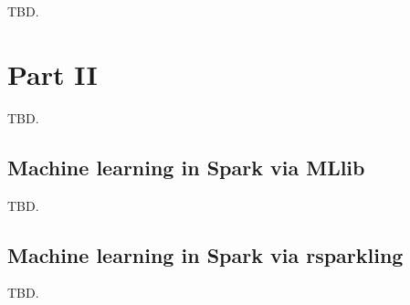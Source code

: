 \documentclass[]{book}
\theoremstyle{definition}
\theoremstyle{definition}
\theoremstyle{definition}
\theoremstyle{remark}
\begin{document}
TBD.

\hypertarget{part-part-ii}{%
\part{Part II}\label{part-part-ii}}

TBD.

\hypertarget{machine-learning-in-spark-via-mllib}{%
\chapter{Machine learning in Spark via
MLlib}\label{machine-learning-in-spark-via-mllib}}

TBD.

\hypertarget{machine-learning-in-spark-via-rsparkling}{%
\chapter{Machine learning in Spark via
rsparkling}\label{machine-learning-in-spark-via-rsparkling}}

TBD.


\end{document}
